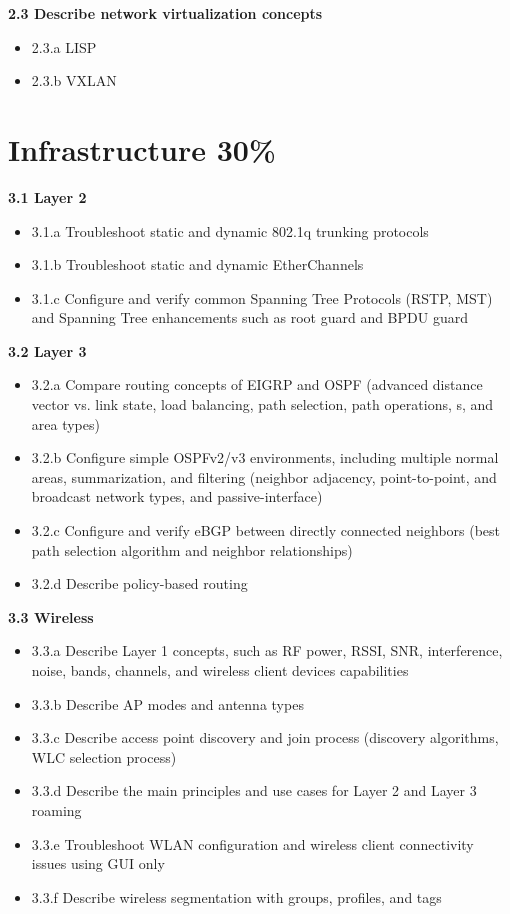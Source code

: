 \documentclass{article}
\begin{document}
\noindent\textbf{2.3 Describe network virtualization concepts}
\begin{itemize}
\item 2.3.a LISP
\item 2.3.b VXLAN
\end{itemize}

\newpage
\section{Infrastructure 30\%}
\textbf{3.1 Layer 2}
\begin{itemize}
\item 3.1.a Troubleshoot static and dynamic 802.1q trunking protocols
\item 3.1.b Troubleshoot static and dynamic EtherChannels
\item 3.1.c Configure and verify common Spanning Tree Protocols (RSTP, MST) and Spanning Tree enhancements such as root guard and BPDU guard
\end{itemize}

\noindent\textbf{3.2 Layer 3}
\begin{itemize}
\item 3.2.a Compare routing concepts of EIGRP and OSPF (advanced distance vector vs. link state, load balancing, path selection, path operations, s, and area types)
\item 3.2.b Configure simple OSPFv2/v3 environments, including multiple normal areas, summarization, and filtering (neighbor adjacency, point-to-point, and broadcast network types, and passive-interface)
\item 3.2.c Configure and verify eBGP between directly connected neighbors (best path selection algorithm and neighbor relationships)
\item 3.2.d Describe policy-based routing
\end{itemize}

\noindent\textbf{3.3 Wireless}
\begin{itemize}
\item 3.3.a Describe Layer 1 concepts, such as RF power, RSSI, SNR, interference, noise, bands, channels, and wireless client devices capabilities
\item 3.3.b Describe AP modes and antenna types
\item 3.3.c Describe access point discovery and join process (discovery algorithms, WLC selection process)
\item 3.3.d Describe the main principles and use cases for Layer 2 and Layer 3 roaming
\item 3.3.e Troubleshoot WLAN configuration and wireless client connectivity issues using GUI only
\item 3.3.f Describe wireless segmentation with groups, profiles, and tags
\end{itemize}
\end{document}
